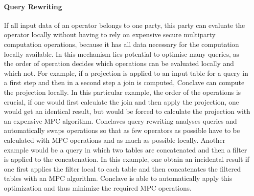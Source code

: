 \paragraph{Query Rewriting}
If all input data of an operator belongs to one party, this party can evaluate the operator locally without having to rely on expensive secure multiparty computation operations, because it has all data necessary for the computation locally available. In this mechanism lies potential to optimise many queries, as the order of operation decides which operations can be evaluated locally and which not. 
For example, if a projection is applied to an input table for a query in a first step and then in a second step a join is computed, Conclave can compute the projection locally. In this particular example, the order of the operations is crucial, if one would first calculate the join and then apply the projection, one would get an identical result, but would be forced to calculate the projection with an expensive MPC algorithm. Conclaves query rewriting analyses queries and automatically swaps operations so that as few operators as possible have to be calculated with MPC operations and as much as possible locally. Another example would be a query in which two tables are concatenated and then a filter is applied to the concatenation. In this example, one obtain an incidental result if one first applies the filter local to each table and then concatenates the filtered tables with an MPC algorithm. Conclave is able to automatically apply this optimization and thus minimize the required MPC operations.
\label{Trust_label}	

